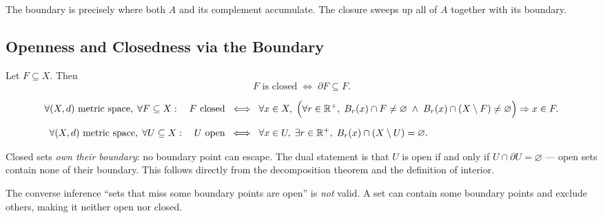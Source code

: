 \begin{remark*}[Intuition]
The boundary is precisely where both $A$ and its complement accumulate.
The closure sweeps up all of $A$ together with its boundary.
\end{remark*}

\subsection{Openness and Closedness via the Boundary}
\label{sec:open-closed-boundary}

\begin{proposition}
\label{prop:closed-owns-boundary}
Let $F \subseteq X$. Then
\[
  F \text{ is closed}
  \;\iff\;
  \partial F \subseteq F.
\]
\end{proposition}

\begin{remark*}
\begin{align*}
\forall (X,d)\ \text{metric space},\;
\forall F \subseteq X:\quad
F\ \text{closed}
&\;\iff\;
\forall x \in X,\;
\Bigl(
  \forall r \in \mathbb{R}^{+},\;
  B_r(x) \cap F \neq \varnothing
  \;\land\;
  B_r(x) \cap (X \setminus F) \neq \varnothing
\Bigr)
\Rightarrow x \in F. \\[6pt]
\forall (X,d)\ \text{metric space},\;
\forall U \subseteq X:\quad
U\ \text{open}
&\;\iff\;
\forall x \in U,\;
\exists r \in \mathbb{R}^{+},\;
B_r(x) \cap (X \setminus U) = \varnothing.
\end{align*}
\end{remark*}

\begin{remark*}[Intuition]
Closed sets \emph{own their boundary}: no boundary point can escape.
The dual statement is that $U$ is open if and only if
$U \cap \partial U = \varnothing$ --- open sets contain none of their
boundary. This follows directly from the decomposition theorem and the
definition of interior.
\end{remark*}

\begin{remark*}
The converse inference ``sets that miss some boundary points are open''
is \emph{not} valid. A set can contain some boundary points and exclude
others, making it neither open nor closed.
\end{remark*}

